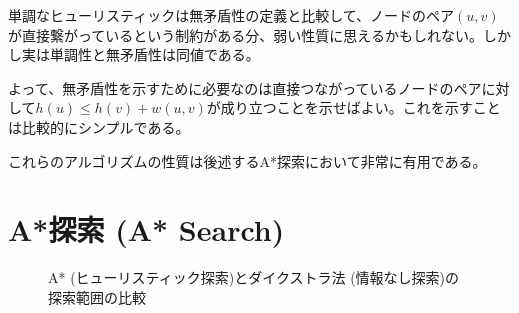単調なヒューリスティックは無矛盾性の定義と比較して、ノードのペア$(u, v)$が直接繋がっているという制約がある分、弱い性質に思えるかもしれない。しかし実は単調性と無矛盾性は同値である。



よって、無矛盾性を示すために必要なのは直接つながっているノードのペアに対して$h(u) \leq h(v) + w(u,v)$が成り立つことを示せばよい。これを示すことは比較的にシンプルである。

これらのアルゴリズムの性質は後述するA*探索において非常に有用である。


\section{A*探索 (A* Search)}
\label{sec:astar-search}

\begin{figure}
  \centering
  \begin{tikzpicture}[scale=0.6]
    
  \end{tikzpicture}
  \caption{A* (ヒューリスティック探索)とダイクストラ法 (情報なし探索)の探索範囲の比較}
\label{fig:dijkstra-astar}  
\end{figure}

